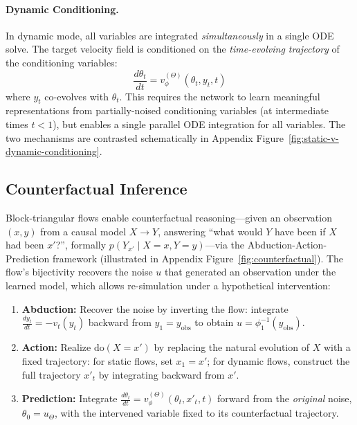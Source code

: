 \paragraph{Dynamic Conditioning.}
In dynamic mode, all variables are integrated \emph{simultaneously} in a single ODE solve. The target velocity field is conditioned on the \emph{time-evolving trajectory} of the conditioning variables:
\begin{equation}
    \frac{d\theta_t}{dt} = v^{(\Theta)}_\phi(\theta_t, y_t, t)
\end{equation}
where $y_t$ co-evolves with $\theta_t$. This requires the network to learn meaningful representations from partially-noised conditioning variables (at intermediate times $t < 1$), but enables a single parallel ODE integration for all variables. The two mechanisms are contrasted schematically in Appendix Figure~\ref{fig:static-v-dynamic-conditioning}.

\subsection{Counterfactual Inference}
\label{sec:counterfactuals}

Block-triangular flows enable counterfactual reasoning---given an observation $(x, y)$ from a causal model $X \to Y$, answering ``what would $Y$ have been if $X$ had been $x'$?'', formally $p(Y_{x'} \mid X{=}x, Y{=}y)$---via the Abduction-Action-Prediction framework \citep{Pearl2009} (illustrated in Appendix Figure~\ref{fig:counterfactual}). The flow's bijectivity recovers the noise $u$ that generated an observation under the learned model, which allows re-simulation under a hypothetical intervention:

\begin{enumerate}
    \item \textbf{Abduction:} Recover the noise by inverting the flow: integrate $\frac{dy_t}{dt} = -v_t(y_t)$ backward from $y_1 = y_{\text{obs}}$ to obtain $u = \phi_1^{-1}(y_{\text{obs}})$.
    \item \textbf{Action:} Realize $\mathrm{do}(X = x')$ by replacing the natural evolution of $X$ with a fixed trajectory: for static flows, set $x_1 = x'$; for dynamic flows, construct the full trajectory $x'_t$ by integrating backward from $x'$.
    \item \textbf{Prediction:} Integrate $\frac{d\theta_t}{dt} = v^{(\Theta)}_\phi(\theta_t, x'_t, t)$ forward from the \emph{original} noise, $\theta_0 = u_\Theta$, with the intervened variable fixed to its counterfactual trajectory.
\end{enumerate}

